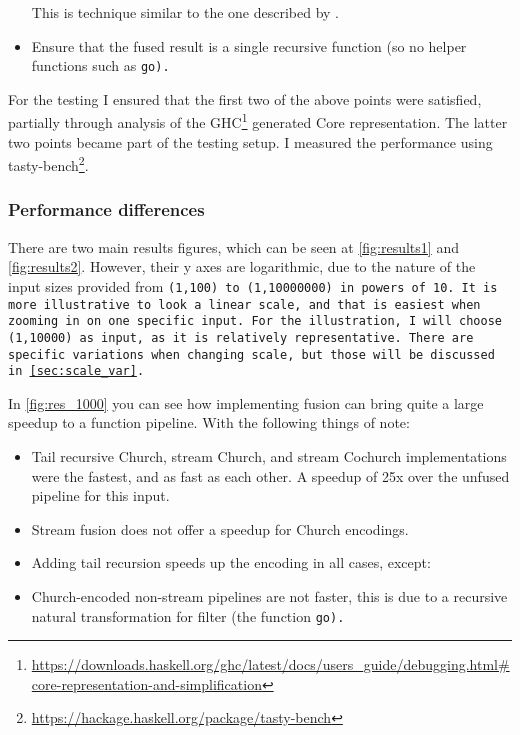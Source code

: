 \begin{itemize}[noitemsep]
    This is technique similar to the one described by \cite{Breitner2018}.
    \item Ensure that the fused result is a single recursive function (so no helper functions such as \tt{go}).

\end{itemize}

For the testing I ensured that the first two of the above points were satisfied, partially through analysis of the GHC\footnote{\url{https://downloads.haskell.org/ghc/latest/docs/users_guide/debugging.html\#core-representation-and-simplification}} generated Core representation.
The latter two points became part of the testing setup.
I measured the performance using tasty-bench\footnote{\url{https://hackage.haskell.org/package/tasty-bench}}.

\subsubsection{Performance differences}
There are two main results figures, which can be seen at \autoref{fig:results1} and \autoref{fig:results2}.
However, their y axes are logarithmic, due to the nature of the input sizes provided from \tt{(1,100)} to \tt{(1,10000000)} in powers of 10.
It is more illustrative to look a linear scale, and that is easiest when zooming in on one specific input.
For the illustration, I will choose \tt{(1,10000)} as input, as it is relatively representative.
There are specific variations when changing scale, but those will be discussed in \autoref{sec:scale_var}.

In \autoref{fig:res_1000} you can see how implementing fusion can bring quite a large speedup to a function pipeline.
With the following things of note:
\begin{itemize}[noitemsep]
    \item Tail recursive Church, stream Church, and stream Cochurch implementations were the fastest, and as fast as each other. A speedup of 25x over the unfused pipeline for this input.
    \item Stream fusion does not offer a speedup for Church encodings.
    \item Adding tail recursion speeds up the encoding in all cases, except:
    \item Church-encoded non-stream pipelines are not faster, this is due to a recursive natural transformation for filter (the function \tt{go}).
\end{itemize}

